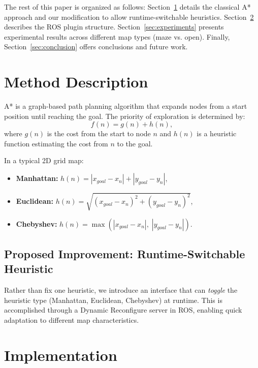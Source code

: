 \documentclass[letterpaper, 10 pt, conference]{ieeeconf}
\begin{document}
The rest of this paper is organized as follows: 
Section~\ref{sec:method} details the classical A* approach and our modification 
to allow runtime-switchable heuristics. Section~\ref{sec:implementation} describes 
the ROS plugin structure. Section~\ref{sec:experiments} presents experimental 
results across different map types (maze vs. open). Finally, 
Section~\ref{sec:conclusion} offers conclusions and future work.


\section{Method Description}\label{sec:method}
A* \cite{hart1968formal} is a graph-based path planning algorithm that expands 
nodes from a start position until reaching the goal. The priority of exploration 
is determined by:
\begin{equation}
f(n) = g(n) + h(n),
\end{equation}
where $g(n)$ is the cost from the start to node $n$ and $h(n)$ is a heuristic 
function estimating the cost from $n$ to the goal. 

In a typical 2D grid map:
\begin{itemize}
    \item \textbf{Manhattan:} $h(n) = |x_{goal} - x_n| + |y_{goal} - y_n|$,
    \item \textbf{Euclidean:} $h(n) = \sqrt{(x_{goal}-x_n)^2 + (y_{goal}-y_n)^2}$,
    \item \textbf{Chebyshev:} $h(n) = \max(|x_{goal} - x_n|,\; |y_{goal} - y_n|).$
\end{itemize}

\subsection{Proposed Improvement: Runtime-Switchable Heuristic}
Rather than fix one heuristic, we introduce an interface that can \textit{toggle} 
the heuristic type (Manhattan, Euclidean, Chebyshev) at runtime. This is accomplished 
through a Dynamic Reconfigure server in ROS, enabling quick adaptation to different 
map characteristics.

\section{Implementation}\label{sec:implementation}
\end{document}
